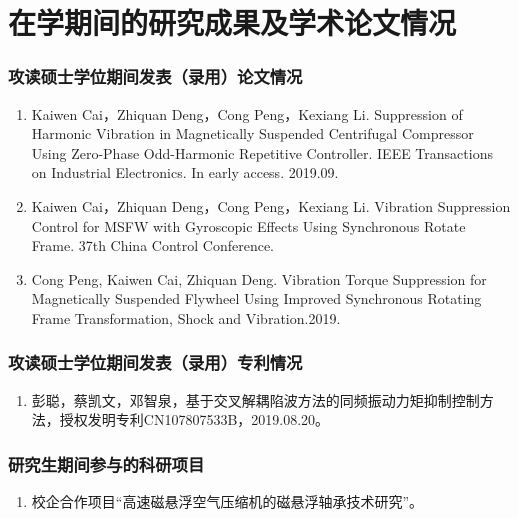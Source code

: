 \chapter{在学期间的研究成果及学术论文情况}


\subsection*{攻读硕士学位期间发表（录用）论文情况}

\begin{enumerate}
  \item Kaiwen Cai，Zhiquan Deng，Cong Peng，Kexiang Li. Suppression of Harmonic Vibration in Magnetically Suspended Centrifugal Compressor Using Zero-Phase Odd-Harmonic Repetitive Controller. IEEE Transactions on Industrial Electronics. In early access. 2019.09.
  \item Kaiwen Cai，Zhiquan Deng，Cong Peng，Kexiang Li. Vibration Suppression Control for MSFW with Gyroscopic Effects Using Synchronous Rotate Frame. 37th China Control Conference.
  \item Cong Peng, Kaiwen Cai, Zhiquan Deng. Vibration Torque Suppression for Magnetically Suspended Flywheel Using Improved Synchronous Rotating Frame Transformation, Shock and Vibration.2019.
\end{enumerate}

\subsection*{攻读硕士学位期间发表（录用）专利情况}

\begin{enumerate}
  \item 彭聪，蔡凯文，邓智泉，基于交叉解耦陷波方法的同频振动力矩抑制控制方法，授权发明专利CN107807533B，2019.08.20。
\end{enumerate}

\subsection*{研究生期间参与的科研项目}

\begin{enumerate}
  \item 校企合作项目“高速磁悬浮空气压缩机的磁悬浮轴承技术研究”。
\end{enumerate}
